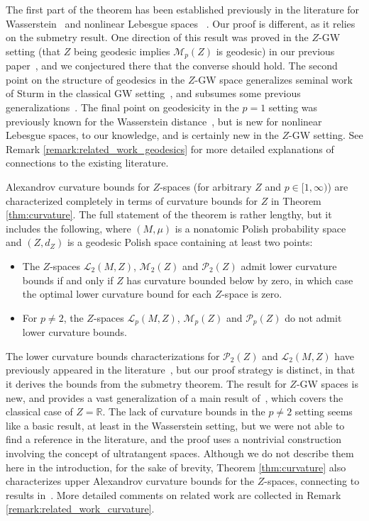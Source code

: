 \documentclass{article}
\theoremstyle{definition}
\newcommand{\R}{\mathbb{R}}
\newcommand{\M}{\mathcal{M}}
\newcommand{\MZp}{\M_p(Z)}
\newcommand{\MZ}[1]{\M_{#1}(Z)}
\newcommand{\WZ}{\mathcal{P}_p(Z)}
\newcommand{\WZp}[1]{\mathcal{P}_{#1}(Z)}
\newcommand{\Lp}{\mathcal{L}_p}
\newcommand{\Lpp}[1]{\mathcal{L}_{#1}}
\begin{document}
The first part of the theorem has been established previously in the literature for Wasserstein~\cite{villani2008optimal} and nonlinear Lebesgue spaces ~\cite{jost2012nonpositive,sturm2003probability,serieys2026nonlinear}. Our proof is different, as it relies on the submetry result. One direction of this result was proved in the $Z$-GW setting (that $Z$ being geodesic implies $\MZp$ is geodesic) in our previous paper~\cite{bauer2025zgromovwassersteindistance}, and we conjectured there that the converse should hold. The second point on the structure of geodesics in the $Z$-GW space generalizes seminal work of Sturm in the classical GW setting~\cite{sturm2020}, and subsumes some previous generalizations~\cite{chowdhury2020gromov,zhang2024geometry}. The final point on geodesicity in the $p=1$ setting was previously known for the Wasserstein distance~\cite{villani2008optimal}, but is new for nonlinear Lebesgue spaces, to our knowledge, and is certainly new in the $Z$-GW setting. See Remark \ref{remark:related_work_geodesics} for more detailed explanations of connections to the existing literature.

\smallskip
{} Alexandrov curvature bounds for $Z$-spaces (for arbitrary $Z$ and $p \in [1,\infty)$) are characterized completely in terms of curvature bounds for $Z$ in Theorem \ref{thm:curvature}. The full statement of the theorem is rather lengthy, but it includes the following, where $(M,\mu)$ is a nonatomic Polish probability space and $(Z,d_Z)$ is a geodesic Polish space containing at least two points:
\begin{itemize}
    \item The $Z$-spaces $\Lpp{2}(M,Z)$, $\MZ{2}$ and $\WZp{2}$ admit lower curvature bounds if and only if $Z$ has curvature bounded below by zero, in which case the optimal lower curvature bound for each $Z$-space is zero. 
    \item For $p \neq 2$, the $Z$-spaces $\Lp(M,Z)$, $\MZp$ and $\WZ$ do not admit lower curvature bounds.
\end{itemize}
The lower curvature bounds characterizations for $\WZp{2}$ and $\Lpp{2}(M,Z)$ have previously appeared in the literature~\cite{Sturm2006geometryI,serieys2026nonlinear}, but our proof strategy is distinct, in that it derives the bounds from the submetry theorem. The result for $Z$-GW spaces is new, and provides a vast generalization of a main result of~\cite{sturm2020}, which covers the classical case of $Z=\R$. The lack of curvature bounds in the $p\neq 2$ setting seems like a basic result, at least in the Wasserstein setting, but we were not able to find a reference in the literature, and the proof uses a nontrivial construction involving the concept of ultratangent spaces. Although we do not describe them here in the introduction, for the sake of brevity, Theorem \ref{thm:curvature} also characterizes upper Alexandrov curvature bounds for the $Z$-spaces, connecting to results in~\cite{jost1994equilibrium,jost2012nonpositive,sturm2001nonlinear,bertrand2012geometric,serieys2026nonlinear,calissano2024populations}. More detailed comments on related work are collected in Remark \ref{remark:related_work_curvature}.
\end{document}
